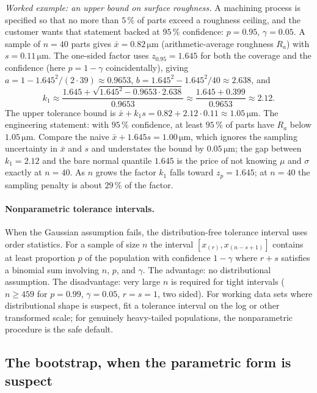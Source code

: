\textit{Worked example: an upper bound on surface roughness.} A
machining process is specified so that no more than $5 \,\%$ of
parts exceed a roughness ceiling, and the customer wants that
statement backed at $95 \,\%$ confidence: $p = 0.95$,
$\gamma = 0.05$. A sample of $n = 40$ parts gives
$\bar{x} = 0.82\,\si{\micro\meter}$ (arithmetic-average roughness
$R_{a}$) with $s = 0.11\,\si{\micro\meter}$. The one-sided factor
uses $z_{0.95} = 1.645$ for both the coverage and the confidence
(here $p = 1 - \gamma$ coincidentally), giving
$a = 1 - 1.645^{2}/(2 \cdot 39) \approx 0.9653$,
$b = 1.645^{2} - 1.645^{2}/40 \approx 2.638$, and
\[
k_{1} \approx \frac{1.645 + \sqrt{1.645^{2} - 0.9653 \cdot 2.638}}
{0.9653} \approx \frac{1.645 + 0.399}{0.9653} \approx 2.12.
\]
The upper tolerance bound is
$\bar{x} + k_{1} s = 0.82 + 2.12 \cdot 0.11 \approx
1.05\,\si{\micro\meter}$. The engineering statement: with
$95 \,\%$ confidence, at least $95 \,\%$ of parts have $R_{a}$
below $1.05\,\si{\micro\meter}$. Compare the naive
$\bar{x} + 1.645 s = 1.00\,\si{\micro\meter}$, which ignores the
sampling uncertainty in $\bar{x}$ and $s$ and understates the
bound by $0.05\,\si{\micro\meter}$; the gap between $k_{1} = 2.12$
and the bare normal quantile $1.645$ is the price of not knowing
$\mu$ and $\sigma$ exactly at $n = 40$. As $n$ grows the factor
$k_{1}$ falls toward $z_{p} = 1.645$; at $n = 40$ the sampling
penalty is about $29 \,\%$ of the factor.

\paragraph{Nonparametric tolerance intervals.} When the
Gaussian assumption fails, the distribution-free tolerance
interval uses order statistics. For a sample of size $n$ the
interval $[x_{(r)}, x_{(n-s+1)}]$ contains at least proportion
$p$ of the population with confidence $1 - \gamma$ where
$r + s$ satisfies a binomial sum involving $n$, $p$, and
$\gamma$. The advantage: no distributional assumption. The
disadvantage: very large $n$ is required for tight intervals
($n \geq 459$ for $p = 0.99$, $\gamma = 0.05$, $r = s = 1$, two
sided). For working data sets where distributional shape is
suspect, fit a tolerance interval on the log or other
transformed scale; for genuinely heavy-tailed populations, the
nonparametric procedure is the safe default.

\subsection{The bootstrap, when the parametric form is suspect}

